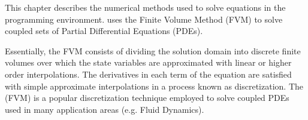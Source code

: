 This chapter describes the numerical methods used to solve equations
in the \FiPy{} programming environment. \FiPy{} uses the Finite Volume
Method (FVM) to solve coupled sets of Partial Differential Equations
(PDEs).

Essentially, the FVM consists of dividing the solution domain into
discrete finite volumes over which the state variables are
approximated with linear or higher order interpolations. The
derivatives in each term of the equation are satisfied with simple
approximate interpolations in a process known as discretization. The
(FVM) is a popular discretization technique employed to solve coupled
PDEs used in many application areas (e.g. Fluid Dynamics).






